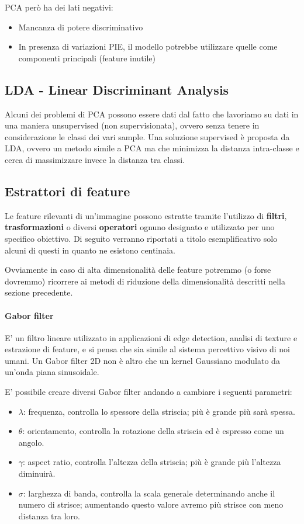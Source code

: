 \documentclass{article}
\begin{document}
\bigskip
PCA però ha dei lati negativi:
\begin{itemize}
    \item Mancanza di potere discriminativo
    \item In presenza di variazioni PIE, il modello potrebbe utilizzare quelle come componenti principali (feature inutile)
\end{itemize}

\subsection{LDA - Linear Discriminant Analysis}
Alcuni dei problemi di PCA possono essere dati dal fatto che lavoriamo su dati in una maniera unsupervised (non supervisionata), ovvero senza tenere in considerazione le classi dei vari sample. Una soluzione supervised è proposta da LDA, ovvero un metodo simile a PCA ma che minimizza la distanza intra-classe e cerca di massimizzare invece la distanza tra classi.


\subsection{Estrattori di feature}
Le feature rilevanti di un'immagine possono estratte tramite l'utilizzo di \textbf{filtri}, \textbf{trasformazioni} o diversi \textbf{operatori} ognuno designato e utilizzato per uno specifico obiettivo. Di seguito verranno riportati a titolo esemplificativo solo alcuni di questi in quanto ne esistono centinaia.

\bigskip
Ovviamente in caso di alta dimensionalità delle feature potremmo (o forse dovremmo) ricorrere ai metodi di riduzione della dimensionalità descritti nella sezione precedente.
\paragraph{Gabor filter}
E' un filtro lineare utilizzato in applicazioni di edge detection, analisi di texture e estrazione di feature, e si pensa che sia simile al sistema percettivo visivo di noi umani.
Un Gabor filter 2D non è altro che un kernel Gaussiano modulato da un'onda piana sinusoidale.

\bigskip
E' possibile creare diversi Gabor filter andando a cambiare i seguenti parametri:
\begin{itemize}
    \item $\lambda$: frequenza, controlla lo spessore della striscia; più è grande più sarà spessa.
    \item $\theta$: orientamento, controlla la rotazione della striscia ed è espresso come un angolo.
    \item $\gamma$: aspect ratio, controlla l'altezza della striscia; più è grande più l'altezza diminuirà.
    \item $\sigma$: larghezza di banda, controlla la scala generale determinando anche il numero di strisce; aumentando questo valore avremo più strisce con meno distanza tra loro.
\end{itemize}
\end{document}
